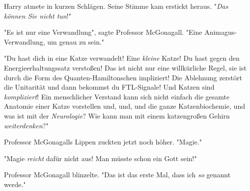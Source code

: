 Harry atmete in kurzen Schlägen. Seine Stimme kam erstickt heraus. "\emph{Das können Sie nicht \emph{tun}}!"

"Es ist nur eine Verwandlung", sagte Professor McGonagall. "Eine Animagus-Verwandlung, um genau zu sein."

"Du hast dich in eine Katze verwandelt! Eine \emph{kleine} Katze! Du hast gegen den Energieerhaltungssatz verstoßen! Das ist nicht nur eine willkürliche Regel, sie ist durch die Form des Quanten-Hamiltonschen impliziert! Die Ablehnung zerstört die Unitarität und dann bekommst du FTL-Signale! Und Katzen sind \emph{kompliziert}! Ein menschlicher Verstand kann sich nicht einfach die gesamte Anatomie einer Katze vorstellen und, und, und die ganze Katzenbiochemie, und was ist mit der \emph{Neurologie}? Wie kann man mit einem katzengroßen Gehirn \emph{weiterdenken}?"

Professor McGonagalls Lippen zuckten jetzt noch höher. "Magie."

"Magie \emph{reicht} dafür nicht aus! Man müsste schon ein Gott sein!"

Professor McGonagall blinzelte. "Das ist das erste Mal, dass ich \emph{so} genannt werde."

